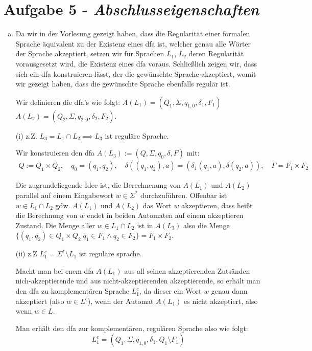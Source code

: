 \documentclass{article}
\begin{document}
\section*{Aufgabe 5 - \textit{Abschlusseigenschaften}}
\begin{enumerate}[a)]
	\item Da wir in der Vorlesung gezeigt haben, dass die Regularität einer formalen Sprache äquivalent zu der Existenz eines dfa ist, welcher genau alle Wörter der Sprache akzeptiert, setzen wir für Sprachen $L_1$, $L_2$ deren Regularität vorausgesetzt wird, die Existenz eines dfa voraus. Schließlich zeigen wir, dass sich ein dfa konstruieren lässt, der die gewünschte Sprache akzeptiert, womit wir gezeigt haben, dass die gewünschte Sprache ebenfalls regulär ist.
	
	Wir definieren die dfa's wie folgt: $A(L_1) = (Q_1,\Sigma, q_{1,0}, \delta_1, F_1)$ $A(L_2) = (Q_2,\Sigma, q_{2,0}, \delta_2, F_2)$.
	
	(i) z.Z.  $L_3 = L_1 \cap L_2 \implies L_3$ ist reguläre Sprache.
	
	Wir konstruieren den dfa $A(L_3) := (Q, \Sigma, q_0, \delta, F)$ mit:
	\begin{align}
		Q := Q_1 \times Q_2,\quad 
		q_0 = (q_1,q_2), \quad
		\delta((q_1,q_2),a) = (\delta_1(q_1,a),\delta(q_2,a)),\quad 
		F = F_1 \times F_2
	\end{align}
	
	Die zugrundeliegende Idee ist, die Berechnenung von $A(L_1)$ und $A(L_2)$ parallel auf einem Eingabewort $w \in \Sigma^*$ durchzuführen. Offenbar ist $w \in L_1 \cap L_2$ gdw. $A(L_1)$ und $A(L_2)$ das Wort $w$ akzeptieren, dass heißt die Berechnung von $w$ endet in beiden Automaten auf einem akzeptieren Zustand. Die Menge aller $w \in L_1 \cap L_2$ ist in $A(L_3)$ also die Menge $\{ (q_1,q_2) \in Q_1\times Q_2 | q_1 \in F_1 \land q_2 \in F_2 \} = F_1 \times F_2$.
	
	(ii) z.Z $L_1^c = \Sigma^* \setminus L_1$ ist reguläre sprache.
	
	Macht man bei enem dfa $A(L_1)$ aus all seinen akzeptierenden Zutsänden nich-akzeptierende und aus nicht-akzeptierenden akzeptierende, so erhält man den dfa zu komplementären Sprache $L_1^c$, da dieser ein Wort $w$ genau dann akzeptiert (also $w \in L^c$), wenn der Automat $A(L_1)$ es nicht akzeptiert, also wenn $w \in L$.
	
	Man erhält den dfa zur komplementären, regulären Sprache also wie folgt:
	\begin{equation}
		L_1^c= (Q_1, \Sigma, q_{1,0}, \delta_1, Q_1 \setminus F_1 )
	\end{equation}
	

\end{enumerate}
\end{document}

